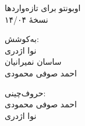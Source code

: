 \thispagestyle{empty}
\begin{center}
\Titrh اوبونتو برای تازه‌واردها\\
\Yagut نسخهٔ ۱۴/۰۴\\
\par\vspace{29mm}
\Titrc به‌کوشش: \\
\Yagut نوا اژدری \\
\Yagut ساسان نمیرانیان \\
\Yagut احمد صوفی محمودی \\
\par\vspace{29mm}
\Titrc حروف‌چینی: \\
\Yagut احمد صوفی محمودی \\
\Yagut نوا اژدری
\end {center}
\newpage
